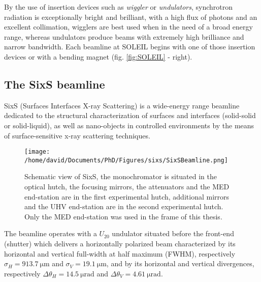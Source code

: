By the use of insertion devices such as \textit{wiggler} or \textit{undulators}, synchrotron radiation is exceptionally bright and brilliant, with a high flux of photons and an excellent collimation, wigglers are best used when in the need of a broad energy range, whereas undulators produce beams with extremely high brilliance and narrow bandwidth.
Each beamline at SOLEIL begins with one of those insertion devices or with a bending magnet (fig. \ref{fig:SOLEIL} - right).

\subsection{The SixS beamline}

SixS (Surfaces Interfaces X-ray Scattering) is a wide-energy range beamline dedicated to the structural characterization of surfaces and interfaces (solid-solid or solid-liquid), as well as nano-objects in controlled environments by the means of surface-sensitive x-ray scattering techniques.

\begin{figure}[!htb]
    \centering
    \texttt{[image: /home/david/Documents/PhD/Figures/sixs/SixSBeamline.png]}
    \caption{
		Schematic view of SixS, the monochromator is situated in the optical hutch, the focusing mirrors, the attenuators and the MED end-station are in the first experimental hutch, additional mirrors and the UHV end-station are in the second experimental hutch.
		Only the MED end-station was used in the frame of this thesis.
    }
    \label{fig:SixSBeamline}
\end{figure}

The beamline operates with a $U_{20}$ undulator situated before the front-end (shutter) which delivers a horizontally polarized beam characterized by its horizontal and vertical full-width at half maximum (FWHM), respectively $\sigma_H = \qty{913.7}{\um}$ and $\sigma_V = \qty{19.1}{\um}$, and by its horizontal and vertical divergences, respectively $\Delta\theta_H = \qty{14.5}{\micro\radian}$ and $\Delta\theta_V = \qty{4.61}{\micro\radian}$.

